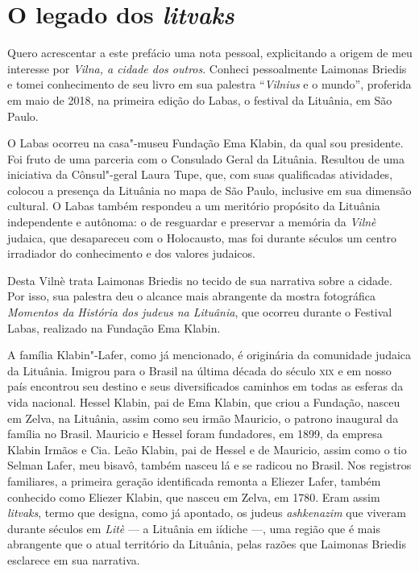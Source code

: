 \section*{O legado dos \textit{litvaks}}

Quero acrescentar a este prefácio uma nota pessoal, explicitando a
origem de meu interesse por \textit{Vilna, a cidade dos outros}. Conheci
pessoalmente Laimonas Briedis e tomei conhecimento de seu livro em sua
palestra ``\textit{Vilnius} e o mundo'', proferida em maio de 2018, na primeira
edição do Labas, o festival da Lituânia, em São Paulo.

O Labas ocorreu na casa"-museu Fundação Ema Klabin, da qual sou
presidente. Foi fruto de uma parceria com o Consulado Geral da Lituânia.
Resultou de uma iniciativa da Cônsul"-geral Laura Tupe, que, com suas
qualificadas atividades, colocou a presença da Lituânia no mapa de São
Paulo, inclusive em sua dimensão cultural. O Labas também respondeu a um
meritório propósito da Lituânia independente e autônoma: o de resguardar
e preservar a memória da \textit{Vilnè} judaica, que desapareceu com o
Holocausto, mas foi durante séculos um centro irradiador do conhecimento
e dos valores judaicos.

Desta Vilnè trata Laimonas Briedis no tecido de sua narrativa sobre a
cidade. Por isso, sua palestra deu o alcance mais abrangente da mostra
fotográfica \textit{Momentos da História dos judeus na Lituânia}, que
ocorreu durante o Festival Labas, realizado na Fundação Ema Klabin.

A família Klabin"-Lafer, como já mencionado, é originária da comunidade
judaica da Lituânia. Imigrou para o Brasil na última década do século
\textsc{xix} e em nosso país encontrou seu destino e seus diversificados caminhos
em todas as esferas da vida nacional. Hessel Klabin, pai de Ema Klabin,
que criou a Fundação, nasceu em Zelva, na Lituânia, assim como seu irmão
Mauricio, o patrono inaugural da família no Brasil. Mauricio e Hessel
foram fundadores, em 1899, da empresa Klabin Irmãos e Cia. Leão Klabin,
pai de Hessel e de Mauricio, assim como o tio Selman Lafer, meu bisavô,
também nasceu lá e se radicou no Brasil. Nos registros familiares, a
primeira geração identificada remonta a Eliezer Lafer, também conhecido
como Eliezer Klabin, que nasceu em Zelva, em 1780. Eram assim
\textit{litvaks}, termo que designa, como já apontado, os judeus
\textit{ashkenazim} que viveram durante séculos em \textit{Litè} --- a Lituânia em
iídiche ---, uma região que é mais abrangente que o atual território da
Lituânia, pelas razões que Laimonas Briedis esclarece em sua narrativa.

